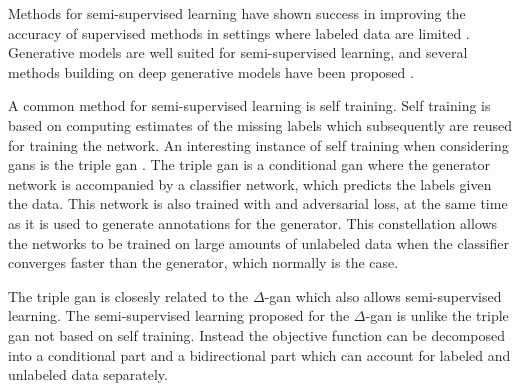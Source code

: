 Methods for semi-supervised learning have shown success in improving the accuracy of supervised methods in settings where labeled data are limited \parencite{Zhou2012}. Generative models are well suited for semi-supervised learning, and several methods building on deep generative models have been proposed \parencite{kingma2014semi, salimans2016improved, springenberg2015unsupervised, wuliu2017selftrainsemisup, li2017triple}.

A common method for semi-supervised learning is self training. Self training is based on computing estimates of the missing labels which subsequently are reused for training the network. An interesting instance of self training when considering \acrshort{gans} is the triple \acrshort{gan} \parencite{li2017triple}. The triple \acrshort{gan} is a conditional \acrshort{gan} where the generator network is accompanied by a classifier network, which predicts the labels given the data. This network is also trained with and adversarial loss, at the same time as it is used to generate annotations for the generator. This constellation allows the networks to be trained on large amounts of unlabeled data when the classifier converges faster than the generator, which normally is the case.

The triple \acrshort{gan} is closesly related to the $\Delta$-\acrshort{gan} \parencite{triangleNIPS20177109} which also allows semi-supervised learning. The semi-supervised learning proposed for the $\Delta$-\acrshort{gan} is unlike the triple \acrshort{gan} not based on self training. Instead the objective function can be decomposed into a conditional part and a bidirectional part which can account for labeled and unlabeled data separately.










